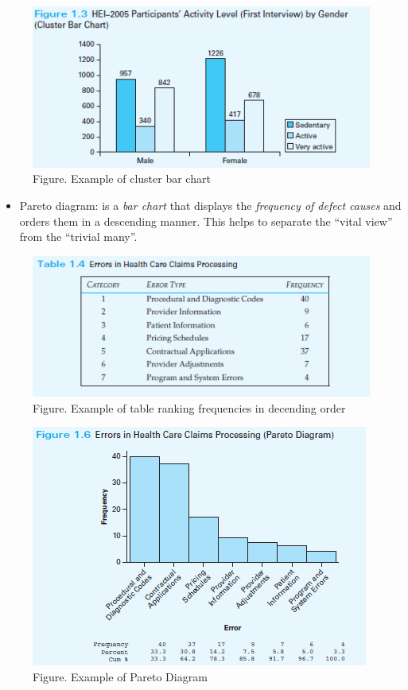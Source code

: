 \documentclass[
]{article}
\providecommand{\tightlist}{%
  \setlength{\itemsep}{0pt}\setlength{\parskip}{0pt}}
\begin{document}
\begin{figure}
\centering
\includegraphics{assets/image/C1-clusterbarchar.PNG}
\caption{Figure. Example of cluster bar chart}
\end{figure}

\begin{itemize}
\tightlist
\item
  Pareto diagram: is a \emph{bar chart} that displays the
  \emph{frequency of defect causes} and orders them in a descending
  manner. This helps to separate the ``vital view'' from the ``trivial
  many''.
\end{itemize}

\begin{figure}
\centering
\includegraphics{assets/image/C1-paretotable.PNG}
\caption{Figure. Example of table ranking frequencies in decending
order}
\end{figure}

\begin{figure}
\centering
\includegraphics{assets/image/C1-paretodiagram.PNG}
\caption{Figure. Example of Pareto Diagram}
\end{figure}
\end{document}
